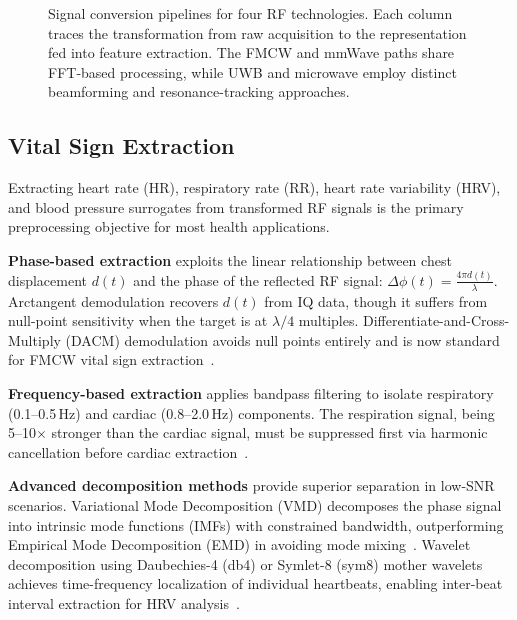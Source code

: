 \documentclass[journal,twoside]{IEEEtran}
\begin{document}
\begin{figure}[!t]
\begin{tikzpicture}
\end{tikzpicture}
\caption{Signal conversion pipelines for four RF technologies. Each column traces the transformation from raw acquisition to the representation fed into feature extraction. The FMCW and mmWave paths share FFT-based processing, while UWB and microwave employ distinct beamforming and resonance-tracking approaches.}
\label{fig:signal_conversion}
\end{figure}


\subsection{Vital Sign Extraction}

Extracting heart rate (HR), respiratory rate (RR), heart rate variability (HRV), and blood pressure surrogates from transformed RF signals is the primary preprocessing objective for most health applications.

\textbf{Phase-based extraction} exploits the linear relationship between chest displacement $d(t)$ and the phase of the reflected RF signal: $\Delta\phi(t) = \frac{4\pi d(t)}{\lambda}$. Arctangent demodulation recovers $d(t)$ from IQ data, though it suffers from null-point sensitivity when the target is at $\lambda/4$ multiples. Differentiate-and-Cross-Multiply (DACM) demodulation avoids null points entirely and is now standard for FMCW vital sign extraction~\cite{ref_fmcw_contactless2025, ref_highprec_mmwave2024}.

\textbf{Frequency-based extraction} applies bandpass filtering to isolate respiratory (0.1--0.5\,Hz) and cardiac (0.8--2.0\,Hz) components. The respiration signal, being 5--10$\times$ stronger than the cardiac signal, must be suppressed first via harmonic cancellation before cardiac extraction~\cite{ref_mmwave_vital2025}.

\textbf{Advanced decomposition methods} provide superior separation in low-SNR scenarios. Variational Mode Decomposition (VMD) decomposes the phase signal into intrinsic mode functions (IMFs) with constrained bandwidth, outperforming Empirical Mode Decomposition (EMD) in avoiding mode mixing~\cite{ref_comprehensive_dataset2024}. Wavelet decomposition using Daubechies-4 (db4) or Symlet-8 (sym8) mother wavelets achieves time-frequency localization of individual heartbeats, enabling inter-beat interval extraction for HRV analysis~\cite{ref_radar_complex2025}.
\end{document}
